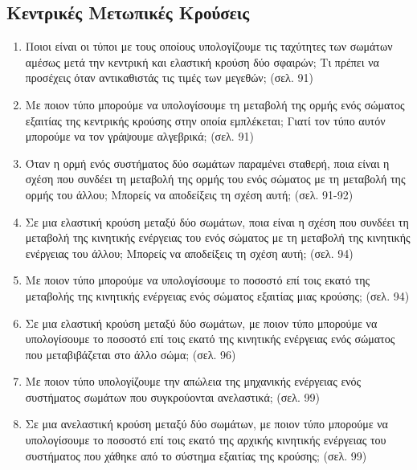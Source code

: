 \documentclass{article}
\begin{document}
\subsection{Κεντρικές Μετωπικές Κρούσεις}

\begin{enumerate}

      \item
            Ποιοι είναι οι τύποι με τους οποίους υπολογίζουμε τις ταχύτητες των σωμάτων αμέσως μετά την κεντρική και ελαστική κρούση δύο σφαιρών; Τι πρέπει να προσέχεις όταν αντικαθιστάς τις τιμές των μεγεθών; (σελ. 91)

      \item
            Με ποιον τύπο μπορούμε να υπολογίσουμε τη μεταβολή της ορμής ενός σώματος εξαιτίας της κεντρικής κρούσης στην οποία εμπλέκεται; Γιατί τον τύπο αυτόν μπορούμε να τον γράψουμε αλγεβρικά; (σελ. 91)

      \item
            Όταν η ορμή ενός συστήματος δύο σωμάτων παραμένει σταθερή, ποια είναι η σχέση που συνδέει τη μεταβολή της ορμής του ενός σώματος με τη μεταβολή της ορμής του άλλου; Μπορείς να αποδείξεις τη σχέση αυτή; (σελ. 91-92)

      \item
            Σε μια ελαστική κρούση μεταξύ δύο σωμάτων, ποια είναι η σχέση που συνδέει τη μεταβολή της κινητικής ενέργειας του ενός σώματος με τη μεταβολή της κινητικής ενέργειας του άλλου; Μπορείς να αποδείξεις τη σχέση αυτή; (σελ. 94)

      \item
            Με ποιον τύπο μπορούμε να υπολογίσουμε το ποσοστό επί τοις εκατό της μεταβολής της κινητικής ενέργειας ενός σώματος εξαιτίας μιας κρούσης; (σελ. 94)

      \item
            Σε μια ελαστική κρούση μεταξύ δύο σωμάτων, με ποιον τύπο μπορούμε να υπολογίσουμε το ποσοστό επί τοις εκατό της κινητικής ενέργειας ενός σώματος που μεταβιβάζεται στο άλλο σώμα; (σελ. 96)

      \item
            Με ποιον τύπο υπολογίζουμε την απώλεια της μηχανικής ενέργειας ενός συστήματος σωμάτων που συγκρούονται ανελαστικά; (σελ. 99)

      \item
            Σε μια ανελαστική κρούση μεταξύ δύο σωμάτων, με ποιον τύπο μπορούμε να υπολογίσουμε το ποσοστό επί τοις εκατό της αρχικής κινητικής ενέργειας του συστήματος που χάθηκε από το σύστημα εξαιτίας της κρούσης; (σελ. 99)


\end{enumerate}
\end{document}
